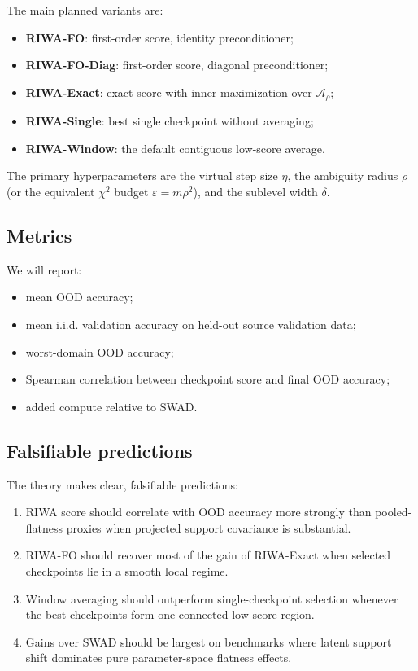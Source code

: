 \documentclass{article}
\newcommand{\iid}{i.i.d.}
\newcommand{\ood}{OOD}
\newcommand{\riwa}{\textup{\textsc{RIWA}}}
\newcommand{\swad}{\textup{\textsc{SWAD}}}
\begin{document}
The main planned variants are:
\begin{itemize}[leftmargin=1.4em]
    \item \textbf{\riwa-FO}: first-order score, identity preconditioner;
    \item \textbf{\riwa-FO-Diag}: first-order score, diagonal preconditioner;
    \item \textbf{\riwa-Exact}: exact score with inner maximization over $\mathcal{A}_{\rho}$;
    \item \textbf{\riwa-Single}: best single checkpoint without averaging;
    \item \textbf{\riwa-Window}: the default contiguous low-score average.
\end{itemize}

The primary hyperparameters are the virtual step size $\eta$, the ambiguity radius $\rho$ (or the equivalent $\chi^2$ budget $\varepsilon = m\rho^2$), and the sublevel width $\delta$.

\subsection{Metrics}

We will report:
\begin{itemize}[leftmargin=1.4em]
    \item mean \ood{} accuracy;
    \item mean \iid{} validation accuracy on held-out source validation data;
    \item worst-domain \ood{} accuracy;
    \item Spearman correlation between checkpoint score and final \ood{} accuracy;
    \item added compute relative to \swad{}.
\end{itemize}

\subsection{Falsifiable predictions}

The theory makes clear, falsifiable predictions:
\begin{enumerate}[leftmargin=1.4em]
    \item \riwa{} score should correlate with \ood{} accuracy more strongly than pooled-flatness proxies when projected support covariance is substantial.
    \item \riwa-FO should recover most of the gain of \riwa-Exact when selected checkpoints lie in a smooth local regime.
    \item Window averaging should outperform single-checkpoint selection whenever the best checkpoints form one connected low-score region.
    \item Gains over \swad{} should be largest on benchmarks where latent support shift dominates pure parameter-space flatness effects.
\end{enumerate}
\end{document}

